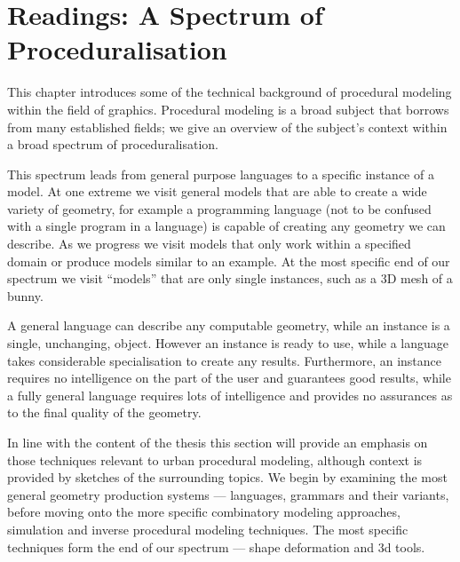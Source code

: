 \graphicspath{{11-readings/images/}}

\chapter{Readings: A Spectrum of Proceduralisation}
\label{c:readings}

This chapter introduces some of the technical background of procedural modeling within the field of graphics. Procedural modeling is a broad subject that borrows from many established fields; we give an overview of the subject's context within a broad spectrum of proceduralisation. 

This spectrum leads from general purpose languages to a specific instance of a model.  At one extreme we visit general models that are able to create a wide variety of geometry, for example a programming language (not to be confused with a single program in a language) is capable of creating any geometry we can describe. As we progress we visit models that only work within a specified domain or produce models similar to an example. At the most specific end of our spectrum we visit ``models'' that are only single instances, such as a 3D mesh of a bunny. 

A general language can describe any computable geometry, while an instance is a single, unchanging, object. However an instance is ready to use, while a language takes considerable specialisation to create any results. Furthermore, an instance requires no intelligence on the part of the user and guarantees good results, while a fully general language requires lots of intelligence and provides no assurances as to the final quality of the geometry.

In line with the content of the thesis this section will provide an emphasis on those techniques relevant to urban procedural modeling, although context is provided by sketches of the surrounding topics. We begin by examining the most general geometry production systems --- languages, grammars and their variants, before moving onto the more specific combinatory modeling approaches, simulation and inverse procedural modeling techniques. The most specific techniques form the end of our spectrum --- shape deformation and 3d tools. 


